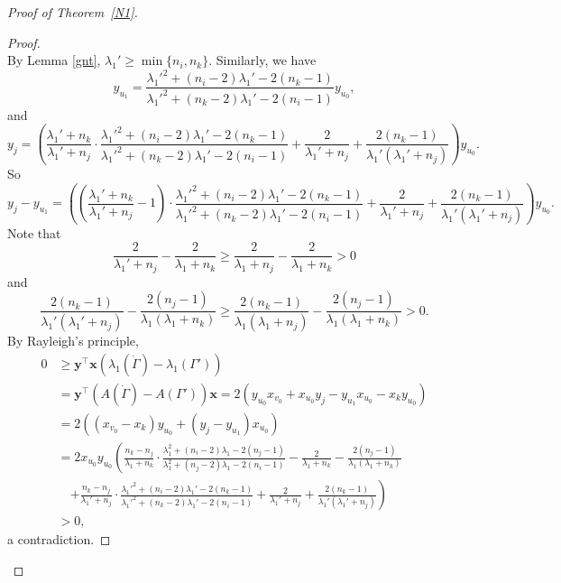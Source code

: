 \documentclass[10pt,a4paper]{amsart}
\numberwithin{equation}{section}
\begin{document}
\begin{proof}[Proof of Theorem~\ref{N1}]
\begin{proof}
\[\]
By Lemma \ref{gnt}, $\lambda_1'\ge \min\{n_i, n_k\}$. 
Similarly, we have 
\[
y_{u_1}=\frac{\lambda_1'^2+(n_i-2)\lambda_1'-2(n_k-1)}{\lambda_1'^2+(n_k-2)\lambda_1'-2(n_i-1)}y_{u_0},  
\]
and 
\[
y_j=\left(\frac{\lambda_1'+n_k}{\lambda_1'+n_j}\cdot\frac{\lambda_1'^2+(n_i-2)\lambda_1'-2(n_k-1)}{\lambda_1'^2+(n_k-2)\lambda_1'-2(n_i-1)}+\frac{2}{\lambda_1'+n_j}+\frac{2(n_k-1)}{\lambda_1'(\lambda_1'+n_j)}\right)y_{u_0}. 
\]
So
\[
y_j-y_{u_1}=\left(\left(\frac{\lambda_1'+n_k}{\lambda_1'+n_j}-1\right)\cdot\frac{\lambda_1'^2+(n_i-2)\lambda_1'-2(n_k-1)}{\lambda_1'^2+(n_k-2)\lambda_1'-2(n_i-1)}+\frac{2}{\lambda_1'+n_j}+\frac{2(n_k-1)}{\lambda_1'(\lambda_1'+n_j)}\right)y_{u_0}.
\]
Note that
\[
\frac{2}{\lambda_1'+n_j}-\frac{2}{\lambda_1+n_k}\ge \frac{2}{\lambda_1+n_j}-\frac{2}{\lambda_1+n_k}>0
\]
and 
\[
\frac{2(n_k-1)}{\lambda_1'(\lambda_1'+n_j)}-\frac{2(n_j-1)}{\lambda_1(\lambda_1+n_k)}\ge \frac{2(n_k-1)}{\lambda_1(\lambda_1+n_j)}-\frac{2(n_j-1)}{\lambda_1(\lambda_1+n_k)}>0.
\]
By Rayleigh's principle, 
\begin{align*}
0& \ge \mathbf{y}^\top\mathbf{x}(\lambda_1(\dot{\Gamma})-\lambda_1(\Gamma'))\\
& = \mathbf{y}^\top\left(A(\dot{\Gamma})-A(\Gamma')\right)\mathbf{x}=2\left(y_{u_0}x_{v_0}+x_{u_0}y_j-y_{u_1}x_{u_0}-x_ky_{u_0}\right)\\ 
& =2\left((x_{v_0}-x_k)y_{u_0}+(y_j-y_{u_1})x_{u_0}\right)\\
& =2x_{u_0}y_{u_0}\left(\frac{n_k-n_j}{\lambda_1+n_k}\cdot\frac{\lambda_1^2+(n_i-2)\lambda_1-2(n_j-1)}{\lambda_1^2+(n_j-2)\lambda_1-2(n_i-1)}-\frac{2}{\lambda_1+n_k}-\frac{2(n_j-1)}{\lambda_1(\lambda_1+n_k)}\right.\\
& \quad\left.+\frac{n_k-n_j}{\lambda_1'+n_j}\cdot\frac{\lambda_1'^2+(n_i-2)\lambda_1'-2(n_k-1)}{\lambda_1'^2+(n_k-2)\lambda_1'-2(n_i-1)}+\frac{2}{\lambda_1'+n_j}+\frac{2(n_k-1)}{\lambda_1'(\lambda_1'+n_j)}\right)\\
& >0, 
\end{align*}
a contradiction. 
\end{proof}


\end{proof}
\end{document}
